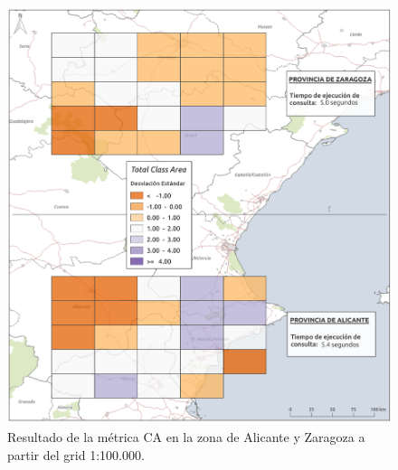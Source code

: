 \begin{figure}
\begin{center}
\includegraphics[width=\textwidth]{ResultadosyDiscusion/Figs/Results/c_100.png}
\caption{Resultado de la métrica CA en la zona de Alicante y Zaragoza a partir del grid 1:100.000.}
\end{center}
\end{figure}

